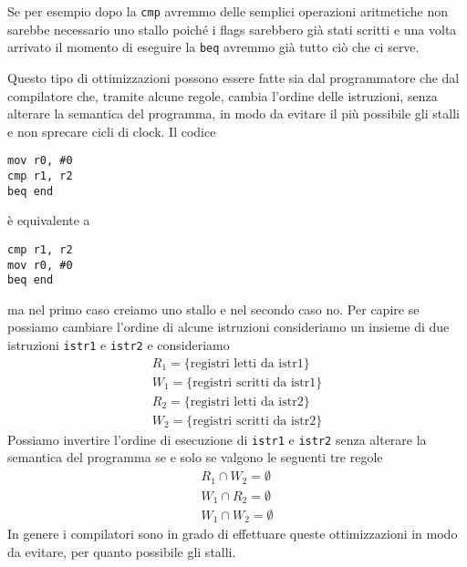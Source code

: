Se per esempio dopo la \verb|cmp| avremmo delle semplici operazioni aritmetiche non sarebbe
necessario uno stallo poiché i flags sarebbero già stati scritti e una volta arrivato il momento di
eseguire la \verb|beq| avremmo già tutto ciò che ci serve.

Questo tipo di ottimizzazioni possono essere fatte sia dal programmatore che dal compilatore che,
tramite alcune regole, cambia l'ordine delle istruzioni, senza alterare la semantica del programma,
in modo da evitare il più possibile gli stalli e non sprecare cicli di clock. Il codice
\begin{verbatim}
mov r0, #0
cmp r1, r2
beq end
\end{verbatim}
è equivalente a
\begin{verbatim}
cmp r1, r2
mov r0, #0
beq end
\end{verbatim}
ma nel primo caso creiamo uno stallo e nel secondo caso no. Per capire se possiamo cambiare
l'ordine di alcune istruzioni consideriamo un insieme di due istruzioni \verb|istr1| e \verb|istr2|
e consideriamo
\begin{gather*}
	R_1 = \{ \text{registri letti da istr1} \} \\
	W_1 = \{ \text{registri scritti da istr1} \} \\
	R_2 = \{ \text{registri letti da istr2} \} \\
	W_2 = \{ \text{registri scritti da istr2} \}
\end{gather*}
Possiamo invertire l'ordine di esecuzione di \verb|istr1| e \verb|istr2| senza alterare la
semantica del programma se e solo se valgono le seguenti tre regole
\begin{gather*}
	R_1 \cap W_2 = \emptyset \\
	W_1 \cap R_2 = \emptyset \\
	W_1 \cap W_2 = \emptyset
\end{gather*}
In genere i compilatori sono in grado di effettuare queste ottimizzazioni in modo da evitare, per
quanto possibile gli stalli.